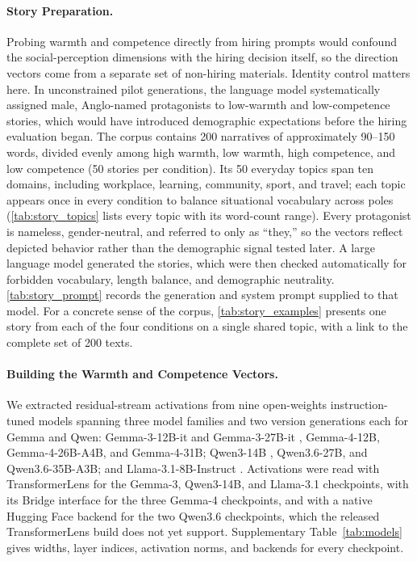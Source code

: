 \documentclass[twocolumn]{article}
\begin{document}
\paragraph{Story Preparation.}
Probing warmth and competence directly from hiring prompts would confound the
social-perception dimensions with the hiring decision itself, so the direction
vectors come from a separate set of non-hiring materials.
Identity control matters here. In unconstrained pilot generations, the
language model systematically assigned male, Anglo-named protagonists to
low-warmth and low-competence stories, which would have introduced
demographic expectations before the hiring evaluation began.
The corpus contains 200 narratives of approximately 90--150 words, divided
evenly among high warmth, low warmth, high competence, and low competence
(50 stories per condition). Its 50 everyday topics span ten domains,
including workplace, learning, community, sport, and travel; each topic
appears once in every condition to balance situational vocabulary across
poles (\autoref{tab:story_topics} lists every topic with its word-count
range). Every protagonist is nameless, gender-neutral, and referred to only
as ``they,'' so the vectors reflect depicted behavior rather than the
demographic signal tested later. A large language model generated
the stories, which were then checked automatically for forbidden vocabulary,
length balance, and demographic neutrality.
\autoref{tab:story_prompt} records the generation and system prompt supplied
to that model. For a concrete sense of the corpus,
\autoref{tab:story_examples} presents one story from each of the four
conditions on a single shared topic, with a link to the complete set of 200
texts.

\paragraph{Building the Warmth and Competence Vectors.}
We extracted residual-stream activations from nine open-weights
instruction-tuned models spanning three model families and two version
generations each for Gemma and Qwen: Gemma-3-12B-it and Gemma-3-27B-it
\citep{gemmateam2025gemma3}, Gemma-4-12B, Gemma-4-26B-A4B, and Gemma-4-31B;
Qwen3-14B \citep{qwen2025qwen3}, Qwen3.6-27B, and Qwen3.6-35B-A3B; and
Llama-3.1-8B-Instruct \citep{grattafiori2024llama3}. Activations were read
with TransformerLens \citep{nanda2022transformerlens} for the Gemma-3,
Qwen3-14B, and Llama-3.1 checkpoints, with its Bridge interface for the
three Gemma-4 checkpoints, and with a native Hugging Face backend for the
two Qwen3.6 checkpoints, which the released TransformerLens build does not
yet support. Supplementary Table~\ref{tab:models} gives widths, layer indices,
activation norms, and backends for every checkpoint.
\end{document}

